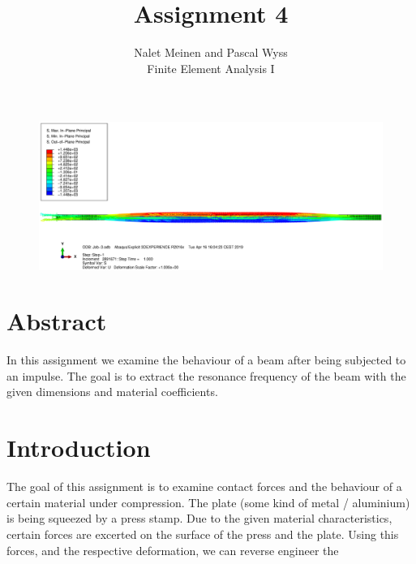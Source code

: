 \documentclass[12pt]{article}
\begin{document}


\title{Assignment 4}%
\author{Nalet Meinen and Pascal Wyss\\ %
Finite Element Analysis I
}


 


\maketitle


\begin{figure}[!htb]
  \centering
  \vspace*{6cm}
  \includegraphics[trim={1cm 4cm 1cm 10cm},clip,width=1.0\linewidth]{pics/title}
\end{figure}

  \pagebreak

\section*{Abstract}
In this assignment we examine the behaviour of a beam after being subjected to an impulse.
The goal is to extract the resonance frequency of the beam with the given dimensions and material coefficients.



\tableofcontents
\pagebreak
\section{Introduction}
The goal of this assignment is to examine contact forces and the behaviour of a certain material under compression.
The plate (some kind of metal / aluminium) is being squeezed by a press stamp. Due to the given material characteristics,
certain forces are excerted on the surface of the press and the plate. 
Using this forces, and the respective deformation, we can reverse engineer the 
\end{document}
